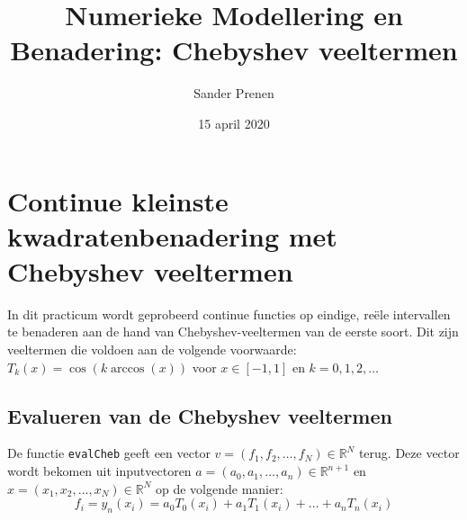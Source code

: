 \documentclass[a4paper, 12pt, titlepage]{article}
\begin{document}
\title{\textbf{Numerieke Modellering en Benadering: Chebyshev veeltermen}}
\author{Sander Prenen}

\date{15 april 2020}
\begin{titlepage}
	\maketitle
	\thispagestyle{empty}
\end{titlepage}

\newpage
\section{Continue kleinste kwadratenbenadering met Chebyshev veeltermen}
In dit practicum wordt geprobeerd continue functies op eindige, re\"ele intervallen te benaderen aan de hand van Chebyshev-veeltermen van de eerste soort. Dit zijn veeltermen die voldoen aan de volgende voorwaarde: $T_k(x) = \cos(k \arccos (x))$ voor $x \in [-1,1]$ en $k = 0,1,2,\ldots$

\subsection{Evalueren van de Chebyshev veeltermen}
De functie \texttt{evalCheb} geeft een vector $v = (f_1, f_2, \ldots, f_N) \in \mathbb{R}^N$ terug. Deze vector wordt bekomen uit inputvectoren $a = (a_0,a_1,\ldots, a_n) \in \mathbb{R}^{n+1}$ en $x = (x_1,x_2,\ldots,x_N) \in \mathbb{R}^N$ op de volgende manier:
$$f_i = y_n(x_i) = a_0T_0(x_i) + a_1T_1(x_i) + \ldots + a_nT_n(x_i)$$
\end{document}
